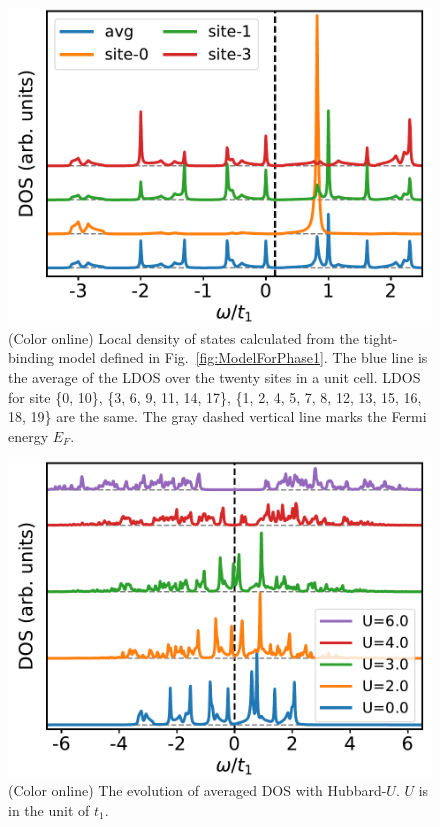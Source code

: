 \documentclass[aps,prb,amsfonts,amsmath,amssymb,showpacs,groupedaddress,superscriptaddress]{revtex4-1}
\begin{document}
\begin{figure}[p]
    \includegraphics[width=0.80\columnwidth]{fig/TBAForPhase1.pdf}
    \caption{\label{fig:TBAForPhase1} (Color online) Local density of states calculated from the tight-binding model defined in Fig.~\ref{fig:ModelForPhase1}. The blue line is the average of the LDOS over the twenty sites in a unit cell. LDOS for site \{0, 10\}, \{3, 6, 9, 11, 14, 17\}, \{1, 2, 4, 5, 7, 8, 12, 13, 15, 16, 18, 19\} are the same. The gray dashed vertical line marks the Fermi energy $E_{F}$.}
\end{figure}

\begin{figure}[p]
    \includegraphics[width=0.8\columnwidth]{fig/CPTForPhase1.pdf}
    \caption{\label{fig:CPTForPhase1} (Color online) The evolution of averaged DOS with Hubbard-$U$. $U$ is in the unit of $t_{1}$.}
\end{figure}
\end{document}
